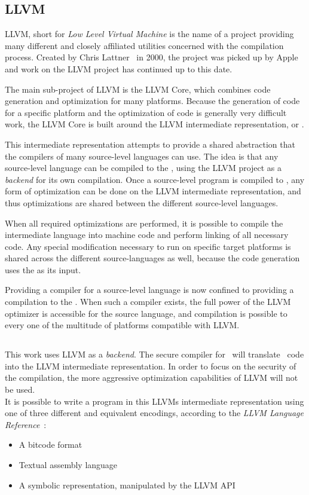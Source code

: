 \subsection{LLVM}
LLVM, short for \emph{Low Level Virtual Machine} is the name of a project providing many different and closely affiliated utilities concerned with the compilation process.
Created by Chris Lattner~\cite{Lattner} in 2000, the project was picked up by Apple and work on the LLVM project has continued up to this date.

The main sub-project of LLVM is the LLVM Core, which combines code generation and optimization for many platforms.
Because the generation of code for a specific platform and the optimization of code is generally very difficult work, the LLVM Core is built around the LLVM intermediate representation, or \LLVMIR.

This intermediate representation attempts to provide a shared abstraction that the compilers of many source-level languages can use.
The idea is that any source-level language can be compiled to the \LLVMIR, using the LLVM project as a \emph{backend} for its own compilation.
Once a source-level program is compiled to \LLVMIR, any form of optimization can be done on the LLVM intermediate representation, and thus optimizations are shared between the different source-level languages.

When all required optimizations are performed, it is possible to compile the intermediate language into machine code and perform linking of all necessary code.
Any special modification necessary to run on specific target platforms is shared across the 
different source-languages as well, because the code generation uses the \LLVMIR as its input.

Providing a compiler for a source-level language is now confined to providing a compilation to the \LLVMIR.
When such a compiler exists, the full power of the LLVM optimizer is accessible for the source language, and compilation is possible to every one of the multitude of platforms compatible with LLVM.

\subsection{\LLVMIR}
This work uses LLVM as a \emph{backend}.
The secure compiler for \MiniML\ will translate \MiniML\ code into the LLVM intermediate representation.
In order to focus on the security of the compilation, the more aggressive optimization capabilities of LLVM will not be used.
\\[1em]
It is possible to write a program in this LLVMs intermediate representation using one of three different and equivalent encodings, according to the \emph{LLVM Language Reference}~\cite{LLVMFAQ}:
\begin{itemize}
\item A bitcode format
\item Textual assembly language
\item A symbolic representation, manipulated by the LLVM API
\end{itemize}

